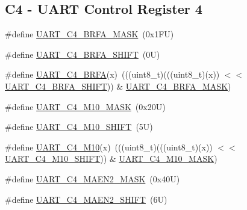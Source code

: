 \subsection*{C4 -\/ U\+A\+RT Control Register 4}
\begin{DoxyCompactItemize}
\item 
\#define \mbox{\hyperlink{group___u_a_r_t___register___masks_ga2f0ab4e5358add87747c744f8ba324fb}{U\+A\+R\+T\+\_\+\+C4\+\_\+\+B\+R\+F\+A\+\_\+\+M\+A\+SK}}~(0x1\+F\+U)
\item 
\#define \mbox{\hyperlink{group___u_a_r_t___register___masks_gae8cac47de1cbd8f8bd2cb10133e4f603}{U\+A\+R\+T\+\_\+\+C4\+\_\+\+B\+R\+F\+A\+\_\+\+S\+H\+I\+FT}}~(0\+U)
\item 
\#define \mbox{\hyperlink{group___u_a_r_t___register___masks_ga6f2c51a18bd4fe60b12fc2e68a18988b}{U\+A\+R\+T\+\_\+\+C4\+\_\+\+B\+R\+FA}}(x)~(((uint8\+\_\+t)(((uint8\+\_\+t)(x)) $<$$<$ \mbox{\hyperlink{group___u_a_r_t___register___masks_gae8cac47de1cbd8f8bd2cb10133e4f603}{U\+A\+R\+T\+\_\+\+C4\+\_\+\+B\+R\+F\+A\+\_\+\+S\+H\+I\+FT}})) \& \mbox{\hyperlink{group___u_a_r_t___register___masks_ga2f0ab4e5358add87747c744f8ba324fb}{U\+A\+R\+T\+\_\+\+C4\+\_\+\+B\+R\+F\+A\+\_\+\+M\+A\+SK}})
\item 
\#define \mbox{\hyperlink{group___u_a_r_t___register___masks_ga9e9d5093d6aec7bd4c3f418ee54f8801}{U\+A\+R\+T\+\_\+\+C4\+\_\+\+M10\+\_\+\+M\+A\+SK}}~(0x20\+U)
\item 
\#define \mbox{\hyperlink{group___u_a_r_t___register___masks_gafd4cf70aa0988a96e3744eae7a0f036d}{U\+A\+R\+T\+\_\+\+C4\+\_\+\+M10\+\_\+\+S\+H\+I\+FT}}~(5\+U)
\item 
\#define \mbox{\hyperlink{group___u_a_r_t___register___masks_ga7cf6f5b1c9f67f2caf54ed725b3ba92e}{U\+A\+R\+T\+\_\+\+C4\+\_\+\+M10}}(x)~(((uint8\+\_\+t)(((uint8\+\_\+t)(x)) $<$$<$ \mbox{\hyperlink{group___u_a_r_t___register___masks_gafd4cf70aa0988a96e3744eae7a0f036d}{U\+A\+R\+T\+\_\+\+C4\+\_\+\+M10\+\_\+\+S\+H\+I\+FT}})) \& \mbox{\hyperlink{group___u_a_r_t___register___masks_ga9e9d5093d6aec7bd4c3f418ee54f8801}{U\+A\+R\+T\+\_\+\+C4\+\_\+\+M10\+\_\+\+M\+A\+SK}})
\item 
\#define \mbox{\hyperlink{group___u_a_r_t___register___masks_gac1c8fa0730a887b5d4d43f426b27c955}{U\+A\+R\+T\+\_\+\+C4\+\_\+\+M\+A\+E\+N2\+\_\+\+M\+A\+SK}}~(0x40\+U)
\item 
\#define \mbox{\hyperlink{group___u_a_r_t___register___masks_ga5ec71022d0264fefd4c63118d90adbb2}{U\+A\+R\+T\+\_\+\+C4\+\_\+\+M\+A\+E\+N2\+\_\+\+S\+H\+I\+FT}}~(6\+U)
\item 

\end{DoxyCompactItemize}
